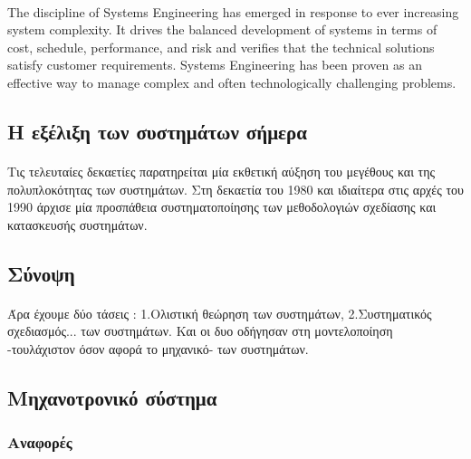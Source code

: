 \documentclass[a4paper,12pt,twoside]{report}
\begin{document}
{			\paragraph{} {The discipline of Systems Engineering has emerged in response to ever increasing system complexity. It drives the balanced development of systems in terms of cost, schedule, performance, and risk and verifies that the technical solutions satisfy customer requirements. Systems Engineering has been proven as an effective way to manage complex and often technologically challenging problems. \cite{MBSESystemArchitectureNavalShipDesign}
			}

		\subsection{Η εξέλιξη των συστημάτων σήμερα}
			\paragraph{} {Τις τελευταίες δεκαετίες παρατηρείται μία εκθετική αύξηση του μεγέθους και της πολυπλοκότητας των συστημάτων.  Στη δεκαετία του 1980 και ιδιαίτερα στις αρχές του 1990 άρχισε μία προσπάθεια συστηματοποίησης των μεθοδολογιών σχεδίασης και κατασκευσής συστημάτων. \cite{FoundationalConceptsMDSD}
			}
			
		\subsection{Σύνοψη}	
		
			\paragraph{}{Άρα έχουμε δύο τάσεις : 1.Ολιστική θεώρηση των συστημάτων, 2.Συστηματικός σχεδιασμός... των συστημάτων. Και οι δυο οδήγησαν στη μοντελοποίηση -τουλάχιστον όσον αφορά το μηχανικό- των συστημάτων.
			}
		
		\subsection{Μηχανοτρονικό σύστημα}
			\subsubsection{Αναφορές}	
				
}
\end{document}
